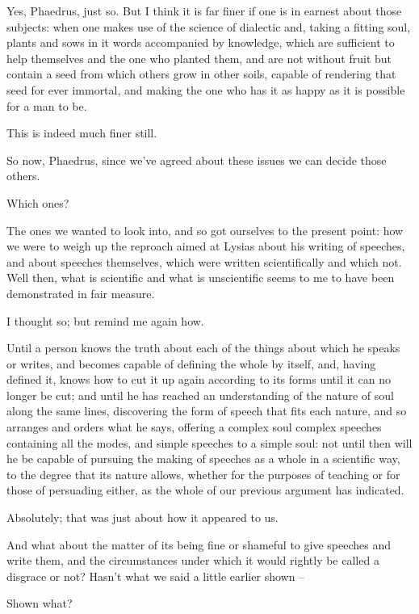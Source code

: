 Yes, Phaedrus, just so. But I think it is far finer if one
 is in earnest about those subjects: when one makes use of the
science of dialectic and, taking a fitting soul, plants and sows in it
words accompanied by knowledge, which are sufficient to help themselves
and the one who planted them, and are not without  fruit but
contain a seed from which others grow in other soils, capable of
rendering that seed for ever immortal, and making the one who has it as
happy as it is possible for a man to be.

This is indeed much finer still. 

So now, Phaedrus, since we've agreed about these issues we can
decide those others.

Which ones?

The ones we wanted to look into, and so got ourselves to the
present point: how we were to weigh up the reproach aimed  at
Lysias about his writing of speeches, and about speeches themselves,
 which were written scientifically and which not. Well then,
what is scientific and what is unscientific seems to me to have been
demonstrated in fair measure.

I thought so; but remind me again how.

Until a person knows the truth about each of the 
things about which he speaks or writes, and becomes capable of defining
the whole by itself, and, having defined it, knows how to cut it up
again according to its forms until it can no longer be cut; and until he
has reached an understanding of the nature of soul along the same lines,
discovering the form of  speech that fits each nature, and so
arranges and orders what he says, offering a
complex soul complex
speeches containing all the modes, and simple speeches to a simple soul:
not until then will he be capable of pursuing the making of speeches as
a whole in a scientific way, to the degree that its nature allows,
 whether for the purposes of teaching or for those of persuading
either, as the whole of our previous argument has indicated.

Absolutely; that was just about how it appeared to us.

And what about the matter of its being fine or 
shameful to give speeches and write them, and the circumstances under
which it would rightly be called a disgrace or not? Hasn't what we said
a little earlier shown --

 Shown what?

